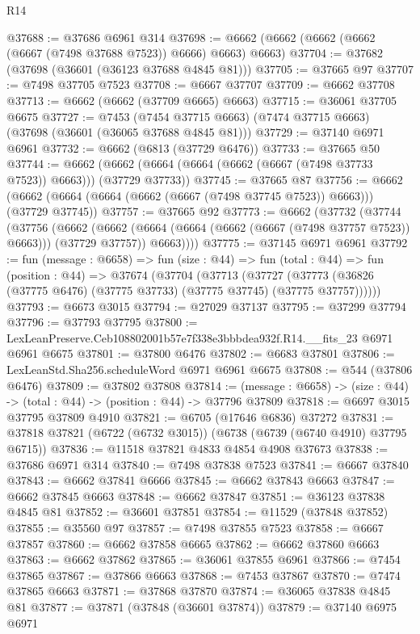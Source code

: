 \begin{lexlean}{R14}
\begin{coremodule}
@37688 := @37686 @6961 @314
@37698 := @6662 (@6662 (@6662 (@6662 (@6667 (@7498 @37688 @7523)) @6666) @6663) @6663)
@37704 := @37682 (@37698 (@36601 (@36123 @37688 @4845 @81)))
@37705 := @37665 @97
@37707 := @7498 @37705 @7523
@37708 := @6667 @37707
@37709 := @6662 @37708
@37713 := @6662 (@6662 (@37709 @6665) @6663)
@37715 := @36061 @37705 @6675
@37727 := @7453
    (@7454 @37715 @6663)
    (@7474 @37715 @6663)
    (@37698 (@36601 (@36065 @37688 @4845 @81)))
@37729 := @37140 @6971 @6961
@37732 := @6662 (@6813 (@37729 @6476))
@37733 := @37665 @50
@37744 := @6662 (@6662 (@6664 (@6664 (@6662 (@6667 (@7498 @37733 @7523)) @6663))) (@37729 @37733))
@37745 := @37665 @87
@37756 := @6662 (@6662 (@6664 (@6664 (@6662 (@6667 (@7498 @37745 @7523)) @6663))) (@37729 @37745))
@37757 := @37665 @92
@37773 := @6662
    (@37732
      (@37744
        (@37756
          (@6662
            (@6662 (@6664 (@6664 (@6662 (@6667 (@7498 @37757 @7523)) @6663))) (@37729 @37757))
            @6663))))
@37775 := @37145 @6971 @6961
@37792 := fun (message : @6658) =>
  fun (size : @44) =>
  fun (total : @44) =>
  fun (position : @44) =>
  @37674
    (@37704
      (@37713
        (@37727 (@37773 (@36826 (@37775 @6476) (@37775 @37733) (@37775 @37745) (@37775 @37757))))))
@37793 := @6673 @3015
@37794 := @27029 @37137
@37795 := @37299 @37794
@37796 := @37793 @37795
@37800 := LexLeanPreserve.Ceb108802001b57e7f338e3bbbdea932f.R14.__fits_23 @6971 @6961 @6675
@37801 := @37800 @6476
@37802 := @6683 @37801
@37806 := LexLeanStd.Sha256.scheduleWord @6971 @6961 @6675
@37808 := @544 (@37806 @6476)
@37809 := @37802 @37808
@37814 := (message : @6658) -> (size : @44) -> (total : @44) -> (position : @44) -> @37796 @37809
@37818 := @6697 @3015 @37795 @37809 @4910
@37821 := @6705 (@17646 @6836) @37272
@37831 := @37818 @37821 (@6722 (@6732 @3015)) (@6738 (@6739 (@6740 @4910) @37795 @6715))
@37836 := @11518 @37821 @4833 @4854 @4908 @37673
@37838 := @37686 @6971 @314
@37840 := @7498 @37838 @7523
@37841 := @6667 @37840
@37843 := @6662 @37841 @6666
@37845 := @6662 @37843 @6663
@37847 := @6662 @37845 @6663
@37848 := @6662 @37847
@37851 := @36123 @37838 @4845 @81
@37852 := @36601 @37851
@37854 := @11529 (@37848 @37852)
@37855 := @35560 @97
@37857 := @7498 @37855 @7523
@37858 := @6667 @37857
@37860 := @6662 @37858 @6665
@37862 := @6662 @37860 @6663
@37863 := @6662 @37862
@37865 := @36061 @37855 @6961
@37866 := @7454 @37865
@37867 := @37866 @6663
@37868 := @7453 @37867
@37870 := @7474 @37865 @6663
@37871 := @37868 @37870
@37874 := @36065 @37838 @4845 @81
@37877 := @37871 (@37848 (@36601 @37874))
@37879 := @37140 @6975 @6971

\end{coremodule}
\end{lexlean}
